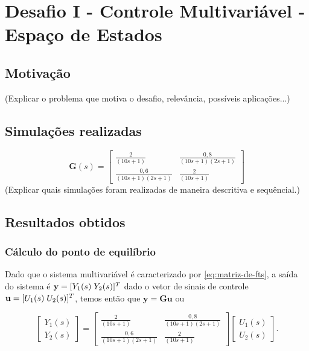 \section{Desafio I - Controle Multivariável - Espaço de Estados} 

\subsection{Motivação}
(Explicar o problema que motiva o desafio, relevância, possíveis aplicações...) 

\subsection{Simulações realizadas}

\begin{equation}
    \label{eq:matriz-de-fts}
    \mathbf{G}(s) = 
        \begin{bmatrix}
            \frac{2}{(10s+1)} & \frac{0,8}{(10s+1)(2s+1)}\\ 
            \frac{0,6}{(10s+1)(2s+1)} & \frac{2}{(10s+1)}
        \end{bmatrix}
\end{equation}
(Explicar quais simulações foram realizadas de maneira descritiva e sequêncial.) 

\subsection{Resultados obtidos}
\label{sub:resultados-obtidos-desafio6}

\subsubsection{Cálculo do ponto de equilíbrio}
\label{subsub:calculo-do-ponto-de-equilibrio}
Dado que o sistema multivariável é caracterizado por \ref{eq:matriz-de-fts}, a
saída do sistema é $\mathbf{y} = [Y_1(s) \thickspace Y_2(s)]^{T}$ dado o vetor de
sinais de controle $\mathbf{u} = [U_1(s) \thickspace U_2(s)]^{T}$, temos então que
$\mathbf{y} = \mathbf{G}\mathbf{u}$ ou 

\begin{equation}
    \label{eq:relacao-entrada-saida-de-g}
    \begin{bmatrix}
        Y_1(s)\\ 
        Y_2(s)
    \end{bmatrix}
    =
    \begin{bmatrix}
        \frac{2}{(10s+1)} & \frac{0,8}{(10s+1)(2s+1)}\\ 
        \frac{0,6}{(10s+1)(2s+1)} & \frac{2}{(10s+1)}
    \end{bmatrix}
    \begin{bmatrix}
        U_1(s)\\ 
        U_2(s)
    \end{bmatrix}.
\end{equation}

